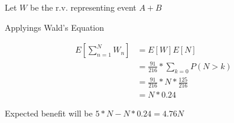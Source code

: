 \documentclass[12pt, a4paper]{article}
\begin{document}
Let $W$ be the r.v. representing event $A+B$

Applyings Wald's Equation

\begin{subequations}
  \begin{align}
    E[\sum_{n=1}^N W_n] &= E[W]E[N]\\
                        &= \frac{91}{216}*\sum_{k=0}P(N > k)\\
                        &= \frac{91}{216}*N*\frac{125}{216}\\
                        &= N*0.24
  \end{align}
\end{subequations}

Expected benefit will be $5*N - N*0.24 = 4.76N$
\end{document}
